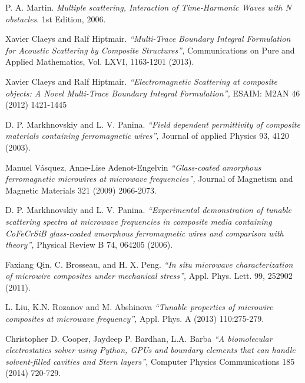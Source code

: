 \documentclass[12pt,letterpaper]{report}
\numberwithin{equation}{section}
\begin{document}
\begin{thebibliography}{9}
	P. A. Martin. 
	\textit{Multiple scattering, Interaction of Time-Harmonic Waves with N obstacles}. 
	1st Edition, 2006.
	
	Xavier Claeys and Ralf Hiptmair. 
	\textit{``Multi-Trace Boundary Integral Formulation for Acoustic Scattering by Composite Structures'',} 
	Communications on Pure and Applied Mathematics, Vol. LXVI, 1163-1201 (2013).
	
	Xavier Claeys and Ralf Hiptmair. 
	\textit{``Electromagnetic Scattering at composite objects: A Novel Multi-Trace Boundary Integral Formulation'',} 
	ESAIM: M2AN 46 (2012) 1421-1445
	
	D. P. Markhnovskiy and L. V. Panina.
	\textit{``Field dependent permittivity of composite materials containing ferromagnetic wires'',} 
	Journal of applied Physics 93, 4120 (2003).
	
	Manuel Vásquez, Anne-Lise Adenot-Engelvin
	\textit{``Glass-coated amorphous ferromagnetic microwires at microwave frequencies'',} 
	Journal of Magnetism and Magnetic Materials 321 (2009) 2066-2073.
	
	D. P. Markhnovskiy and L. V. Panina.
	\textit{``Experimental demonstration of tunable scattering spectra at microwave frequencies in composite media containing CoFeCrSiB glass-coated amorphous ferromagnetic wires and comparison with theory'',} 
	Physical Review B 74, 064205 (2006).	
	
	Faxiang Qin, C. Brosseau, and H. X. Peng.
	\textit{``In situ microwave characterization of microwire composites under mechanical stress'',} 
	Appl. Phys. Lett. 99, 252902 (2011).
	
	L. Liu, K.N. Rozanov and M. Abshinova
	\textit{``Tunable properties of microwire composites at microwave frequency'',} 
	Appl. Phys. A (2013) 110:275-279.		
	
	Christopher D. Cooper, Jaydeep P. Bardhan, L.A. Barba
	\textit{``A biomolecular electrostatics solver using Python, GPUs and boundary
	elements that can handle solvent-filled cavities and Stern layers'',} 
	Computer Physics Communications 185 (2014) 720-729.	
	
	
	
		
	\end{thebibliography}


\pagebreak
\end{document}
